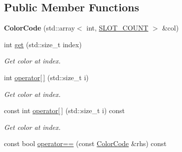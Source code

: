 \subsection*{Public Member Functions}
\begin{DoxyCompactItemize}
\item 
\hypertarget{classmastermind_1_1_color_code_adeaf19c7d44e9e7552b2f290cc4b4c73}{}\label{classmastermind_1_1_color_code_adeaf19c7d44e9e7552b2f290cc4b4c73} 
{\bfseries Color\+Code} (std\+::array$<$ int, \hyperlink{classmastermind_1_1_mastermind_ad4cfc8127641ff8dfe89d65ae232331c}{S\+L\+O\+T\+\_\+\+C\+O\+U\+NT} $>$ \&col)
\item 
\hypertarget{classmastermind_1_1_color_code_ae3d2789ec5586ee1b11046cb50a7e82b}{}\label{classmastermind_1_1_color_code_ae3d2789ec5586ee1b11046cb50a7e82b} 
int \hyperlink{classmastermind_1_1_color_code_ae3d2789ec5586ee1b11046cb50a7e82b}{get} (std\+::size\+\_\+t index)
\begin{DoxyCompactList}\small\item\em Get color at index. \end{DoxyCompactList}\item 
\hypertarget{classmastermind_1_1_color_code_ac81a24c4535a8a818d531b8323c994c3}{}\label{classmastermind_1_1_color_code_ac81a24c4535a8a818d531b8323c994c3} 
int \hyperlink{classmastermind_1_1_color_code_ac81a24c4535a8a818d531b8323c994c3}{operator\mbox{[}$\,$\mbox{]}} (std\+::size\+\_\+t i)
\begin{DoxyCompactList}\small\item\em Get color at index. \end{DoxyCompactList}\item 
\hypertarget{classmastermind_1_1_color_code_a65e2c2ca001cf84b8d4e6ead989a9481}{}\label{classmastermind_1_1_color_code_a65e2c2ca001cf84b8d4e6ead989a9481} 
const int \hyperlink{classmastermind_1_1_color_code_a65e2c2ca001cf84b8d4e6ead989a9481}{operator\mbox{[}$\,$\mbox{]}} (std\+::size\+\_\+t i) const
\begin{DoxyCompactList}\small\item\em Get color at index. \end{DoxyCompactList}\item 
\hypertarget{classmastermind_1_1_color_code_a3b778f7bcc0d5018185239f2329d0e44}{}\label{classmastermind_1_1_color_code_a3b778f7bcc0d5018185239f2329d0e44} 
const bool \hyperlink{classmastermind_1_1_color_code_a3b778f7bcc0d5018185239f2329d0e44}{operator==} (const \hyperlink{classmastermind_1_1_color_code}{Color\+Code} \&rhs) const

\end{DoxyCompactItemize}

